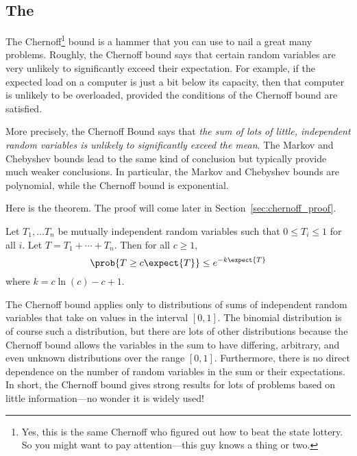 \subsection{The }

The Chernoff\footnote{Yes, this is the same Chernoff who figured out
  how to beat the state lottery.  So you might want to pay
  attention---this guy knows a thing or two.} bound is a hammer that
you can use to nail a great many problems.  Roughly, the Chernoff
bound says that certain random variables are very unlikely to
significantly exceed their expectation.  For example, if the expected
load on a computer is just a bit below its capacity, then that
computer is unlikely to be overloaded, provided the conditions of the
Chernoff bound are satisfied.

More precisely, the Chernoff Bound says that \emph{the sum of lots of
  little, independent random variables is unlikely to significantly
  exceed the mean}.  The Markov and Chebyshev bounds lead to the same
kind of conclusion but typically provide much weaker conclusions.  In
particular, the Markov and Chebyshev bounds are polynomial, while the
Chernoff bound is exponential.

Here is the theorem.  The proof will come later in
Section~\ref{sec:chernoff_proof}.

\begin{theorem}
\label{chernoff}
Let $T_1, \dots T_n$ be mutually independent random variables such
that $0 \leq T_i \leq 1$ for all $i$.  Let $T = T_1 + \cdots + T_n$.
Then for all $c \geq 1$,
\begin{equation}\label{chernoff-leq}
\prob{T \geq c \expect{T}} \leq e^{-k \expect{T}}
\end{equation}
where $k = c \ln(c) - c + 1$.
\end{theorem}

The Chernoff bound applies only to distributions of sums of
independent random variables that take on values in the interval $[0,
  1]$.  The binomial distribution is of course such a distribution,
but there are lots of other distributions because the Chernoff bound
allows the variables in the sum to have differing, arbitrary, and even
unknown distributions over the range $[0, 1]$.  Furthermore, there is
no direct dependence on the number of random variables in the sum or
their expectations.  In short, the Chernoff bound gives strong results
for lots of problems based on little information---no wonder it is
widely used!

